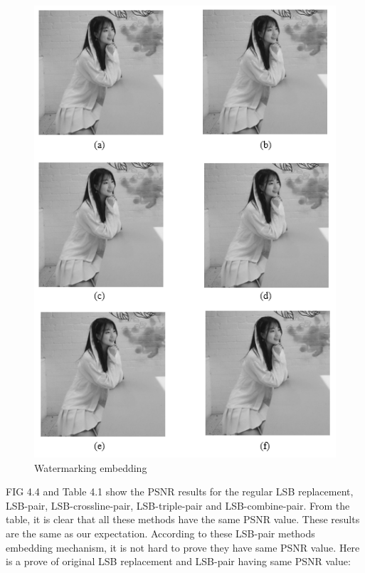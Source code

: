\begin{figure}[h]
\includegraphics[width=\columnwidth]{image/abcdef.PNG}
\caption{Watermarking embedding}
\label{fig:figure}
\end{figure} 


FIG 4.4 and Table 4.1 show the PSNR results for the regular LSB replacement, LSB-pair, LSB-crossline-pair, LSB-triple-pair and LSB-combine-pair. From the table, it is clear that all these methods have the same PSNR value. These results are the same as our expectation. According to these LSB-pair methods embedding mechanism, it is not hard to prove they have same PSNR value. Here is a prove of original LSB replacement and LSB-pair having same PSNR value: 

